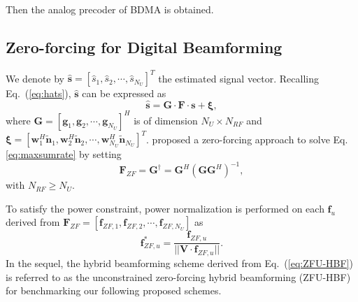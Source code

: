 \documentclass[conference]{IEEEtran}
\begin{document}
Then the analog precoder of BDMA is obtained.




\subsection{Zero-forcing for Digital Beamforming}
We denote by $\hat{\bm s}=\left[\hat{s}_1,\hat{s}_2,\cdots,\hat{s}_{N_U}\right]^T$ the estimated signal vector. Recalling Eq.~(\ref{eq:hats}), $\hat{\bm s}$ can be expressed as \cite{alkhateeb2014channel}
\begin{equation}\label{eq:hatsAllUsers}
\hat{\bm s} = {\bm G}\cdot \bm{F} \cdot\bm{s} + \bm{\xi},
\end{equation}
where ${\bm G}=\left[{\bm g}_1,{\bm g}_2,\cdots,{\bm g}_{N_U}\right]^H$ is of dimension $N_U\times N_{RF}$ and ${\bm \xi}=\left[{\bm w}_1^H\tilde{\bm n}_1,{\bm w}_2^H\tilde{\bm n}_2,\cdots,{\bm w}_{N_U}^H\tilde{\bm n}_{N_U}\right]^T$. \cite{alkhateeb2014channel} proposed a zero-forcing approach to solve Eq. \eqref{eq:maxsumrate} by setting
\begin{equation}\label{eq:ZF}
\bm{F}_{ZF}={\bm G}^\dagger = \bm{G}^H(\bm{G}\bm{G}^H)^{-1},
\end{equation}
with $N_{RF}\geq N_U$.

To satisfy the power constraint, power normalization is performed on each ${\bm f}_u$ derived from $\bm{F}_{ZF}=\left[\bm{f}_{ZF,1},\bm{f}_{ZF,2},\cdots,\bm{f}_{ZF,N_U}\right]$ as
\begin{equation}\label{eq:ZFU-HBF}
\bm{f}^*_{ZF,u} = {\frac{\bm{f}_{ZF,u}}{||\bm{V}\cdot\bm{f}_{ZF,u}||}}.
\end{equation}
In the sequel, the hybrid beamforming scheme derived from Eq.~(\ref{eq:ZFU-HBF}) is referred to as the unconstrained zero-forcing hybrid beamforming (ZFU-HBF) for benchmarking our following proposed schemes.
\end{document}
